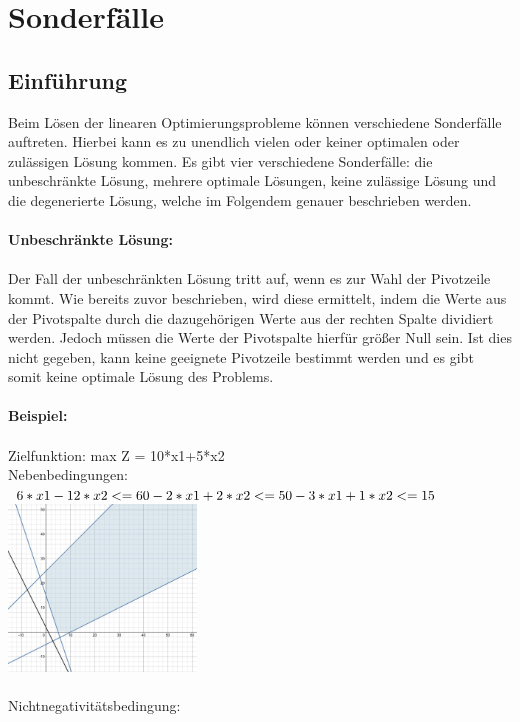 \section{Sonderfälle}
\subsection{Einführung}
Beim Lösen der linearen Optimierungsprobleme können verschiedene Sonderfälle auftreten. Hierbei kann es zu unendlich vielen oder keiner optimalen oder zulässigen Lösung kommen.
Es gibt vier verschiedene Sonderfälle: die unbeschränkte Lösung, mehrere optimale Lösungen, keine zulässige Lösung und die degenerierte Lösung, welche im Folgendem genauer beschrieben werden.\\\\
\textbf{Unbeschränkte Lösung:}\\\\
Der Fall der unbeschränkten Lösung tritt auf, wenn es zur Wahl der Pivotzeile kommt. Wie bereits zuvor beschrieben, wird diese ermittelt, indem die Werte aus der Pivotspalte durch die dazugehörigen Werte aus der rechten Spalte dividiert werden. Jedoch müssen die Werte der Pivotspalte hierfür größer Null sein. Ist dies nicht gegeben, kann keine geeignete Pivotzeile bestimmt werden und es gibt somit keine optimale Lösung des Problems.
\\\\
\textbf{Beispiel:}\\\\
Zielfunktion: max Z = 10*x1+5*x2\\
Nebenbedingungen:\\\begin{math}
6*x1-12*x2 <= 60\\
-2*x1+2*x2 <= 50\\
-3*x1 +1*x2 <= 15\\\end{math}
\includegraphics[width=5cm,right]{images/IMG_unbeschrankte_Losung.jpeg}
\\\\
Nichtnegativitätsbedingung:
